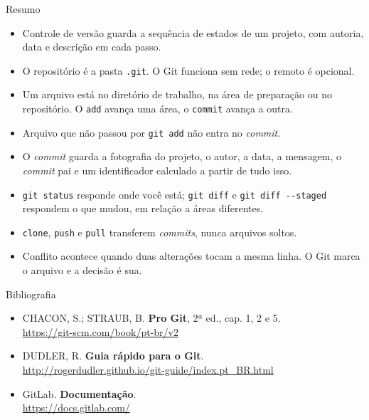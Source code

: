\documentclass{beamer}
\newcommand{\ddash}{-\mbox{}-}
\begin{document}
\begin{frame}{Resumo}
  \small
  \begin{itemize}
    \item Controle de versão guarda a sequência de estados de um projeto, com
          autoria, data e descrição em cada passo.
    \item O repositório é a pasta \texttt{.git}. O Git funciona sem rede; o
          remoto é opcional.
    \item Um arquivo está no diretório de trabalho, na área de preparação ou no
          repositório. O \texttt{add} avança uma área, o \texttt{commit} avança
          a outra.
    \item Arquivo que não passou por \texttt{git add} não entra no
          \textit{commit}.
    \item O \textit{commit} guarda a fotografia do projeto, o autor, a data, a
          mensagem, o \textit{commit} pai e um identificador calculado a partir
          de tudo isso.
    \item \texttt{git status} responde onde você está; \texttt{git diff} e
          \texttt{git diff \ddash staged} respondem o que mudou, em relação a áreas
          diferentes.
    \item \texttt{clone}, \texttt{push} e \texttt{pull} transferem
          \textit{commits}, nunca arquivos soltos.
    \item Conflito acontece quando duas alterações tocam a mesma linha. O Git
          marca o arquivo e a decisão é sua.
  \end{itemize}
\end{frame}

\begin{frame}{Bibliografia}
  \begin{itemize}
    \item CHACON, S.; STRAUB, B. \textbf{Pro Git}, 2ª ed., cap. 1, 2 e 5. \\
          \url{https://git-scm.com/book/pt-br/v2}
    \item DUDLER, R. \textbf{Guia rápido para o Git}. \\
          \url{http://rogerdudler.github.io/git-guide/index.pt_BR.html}
    \item GitLab. \textbf{Documentação}. \\
          \url{https://docs.gitlab.com/}
  \end{itemize}
\end{frame}
\end{document}
